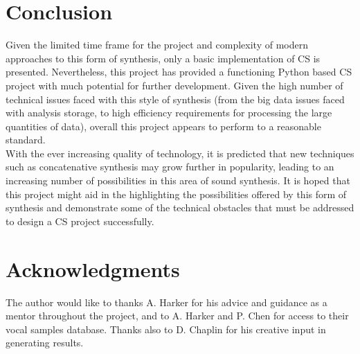 \documentclass{scrartcl}
\begin{document}
    \section*{Conclusion}
    Given the limited time frame for the project and complexity of modern
    approaches to this form of synthesis, only a basic implementation of CS is
    presented. Nevertheless, this project has provided a functioning Python
    based CS project with much potential for further development. Given the
    high number of technical issues faced with this style of synthesis (from
    the big data issues faced with analysis storage, to high efficiency
    requirements for processing the large quantities of data), overall this
    project appears to perform to a reasonable standard.\\
    With the ever increasing quality of technology, it is predicted that new
    techniques such as concatenative synthesis may grow further in popularity,
    leading to an increasing number of possibilities in this area of sound
    synthesis. It is hoped that this project might aid in the highlighting the
    possibilities offered by this form of synthesis and demonstrate some of the
    technical obstacles that must be addressed to design a CS project
    successfully.

    \section*{Acknowledgments}
    The author would like to thanks A. Harker for his advice and guidance
    as a mentor throughout the project, and to A. Harker and P. Chen for access
    to their vocal samples database.  Thanks also to D. Chaplin for his
    creative input in generating results.

    \printbibliography
\end{document}
